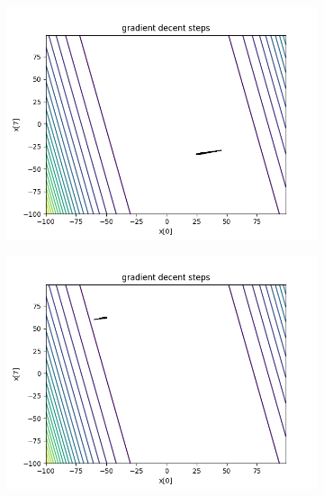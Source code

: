 	\begin{figure}[h!]
		\centering
		\begin{subfigure}[b]{0.45\linewidth}
			\includegraphics[width=\linewidth]{photos/f3_1_1.png}
		\end{subfigure}
		\begin{subfigure}[b]{0.45\linewidth}
			\includegraphics[width=\linewidth]{photos/f3_2_1.png}
		\end{subfigure}
		\begin{subfigure}[b]{0.45\linewidth}

\end{subfigure}
\end{figure}

